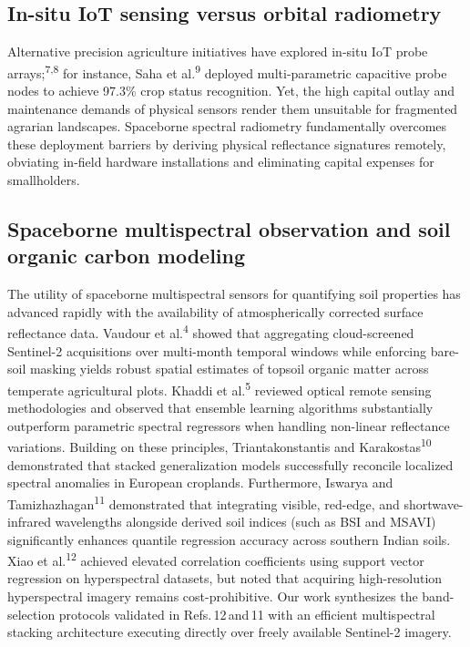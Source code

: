 \documentclass[a4paper,10pt]{article}
\begin{document}
\subsection{In-situ IoT sensing versus orbital radiometry}
Alternative precision agriculture initiatives have explored in-situ IoT probe arrays;\textsuperscript{7,8} for instance, Saha et al.\textsuperscript{9} deployed multi-parametric capacitive probe nodes to achieve 97.3\% crop status recognition. Yet, the high capital outlay and maintenance demands of physical sensors render them unsuitable for fragmented agrarian landscapes. Spaceborne spectral radiometry fundamentally overcomes these deployment barriers by deriving physical reflectance signatures remotely, obviating in-field hardware installations and eliminating capital expenses for smallholders.

\subsection{Spaceborne multispectral observation and soil organic carbon modeling}
The utility of spaceborne multispectral sensors for quantifying soil properties has advanced rapidly with the availability of atmospherically corrected surface reflectance data. Vaudour et al.\textsuperscript{4} showed that aggregating cloud-screened Sentinel-2 acquisitions over multi-month temporal windows while enforcing bare-soil masking yields robust spatial estimates of topsoil organic matter across temperate agricultural plots. Khaddi et al.\textsuperscript{5} reviewed optical remote sensing methodologies and observed that ensemble learning algorithms substantially outperform parametric spectral regressors when handling non-linear reflectance variations. Building on these principles, Triantakonstantis and Karakostas\textsuperscript{10} demonstrated that stacked generalization models successfully reconcile localized spectral anomalies in European croplands. Furthermore, Iswarya and Tamizhazhagan\textsuperscript{11} demonstrated that integrating visible, red-edge, and shortwave-infrared wavelengths alongside derived soil indices (such as BSI and MSAVI) significantly enhances quantile regression accuracy across southern Indian soils. Xiao et al.\textsuperscript{12} achieved elevated correlation coefficients using support vector regression on hyperspectral datasets, but noted that acquiring high-resolution hyperspectral imagery remains cost-prohibitive. Our work synthesizes the band-selection protocols validated in Refs.\,12\,and\,11 with an efficient multispectral stacking architecture executing directly over freely available Sentinel-2 imagery.
\end{document}

